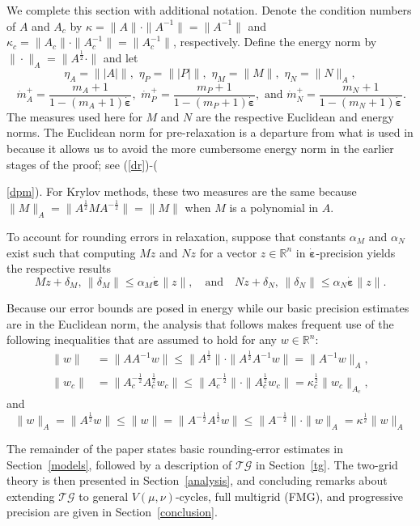 \documentclass[onefignum,onetabnum]{siamart220329}
\newcommand{\ewed}{\boldsymbol{\dot{\varepsilon}}}
\renewcommand{\Re}{\mathbb{R}}
\newcommand{\aladot}{{\dot{m}}_A^+}
\newcommand{\alpdot}{{\dot{m}}_P^+}
\newcommand{\alndot}{{\dot{m}}_N^+}
\newcommand{\tg}{$\mathcal{TG}$}
\begin{document}
We complete this section with additional notation. 
Denote the condition numbers of $A$ and $A_c$ by $\kappa = \|A\| \cdot \|A^{-1}\| =  \|A^{-1}\|$ and $\kappa_c = \|A_c\| \cdot \|A_c^{-1}\| = \|A_c^{-1}\|$, respectively. Define the energy norm by $\|\cdot\|_A = \|A^\frac{1}{2} \cdot\|$ and let
\[
\eta_A= \||A|\|, \,\, \eta_P = \||P|\|, \,\, \eta_M= \|M\|, \,\, \eta_N = \|N\|_A, 
\]
\[
\, \aladot = \frac{m_A + 1}{1 - (m_A + 1){\ewed}} , \,\, \alpdot = \frac{m_P + 1}{1 - (m_P + 1)\ewed} , \textrm{   and   }\alndot = \frac{m_N + 1}{1 - (m_N + 1)\ewed} .
\]
The measures used here for $M$ and $N$ are the respective Euclidean and energy norms. The Euclidean norm for pre-relaxation is a departure from what is used in \cite{McCormick2021} because it allows us to avoid the more cumbersome energy norm in the earlier stages of the proof; see (\ref{dr})-({\ref{dpm}). For Krylov methods, these two measures are the same because $\|M\|_A = \|A^\frac{1}{2}MA^{-\frac{1}{2}}\| = \|M\|$ when $M$ is a polynomial in $A$.

To account for rounding errors in relaxation, suppose that constants $\alpha_M$ and $\alpha_N$ exist such that computing $M z$ and $N z$ for a vector $z \in \Re^n$ in $\ewed$-precision yields the respective results
\begin{equation}
M  z + \delta_M, \, \|\delta_M\| \le \alpha_M \ewed \|z\|, \quad \textrm{and} \quad
N  z + \delta_N, \, \|\delta_N\| \le \alpha_N \ewed \|z\|.
\label{mest}
\end{equation}

Because our error bounds are posed in energy while our basic precision estimates are in the Euclidean norm, the analysis that follows makes frequent use of the following inequalities that are assumed to hold for any $w\in\Re^n$:
\begin{align}
\|w\| &= \|AA^{-1}w\| \le \|A^\frac{1}{2}\| \cdot \|A^\frac{1}{2}A^{-1}w\|= \|A^{-1}w\|_A , 
\label{r}\\
\|w_c\| &= \|A_c^{-\frac{1}{2}}A_c^\frac{1}{2}w_c\| \le \|A_c^{-\frac{1}{2}}\| \cdot \|A_c^\frac{1}{2}w_c\|= \kappa_c^\frac{1}{2} \|w_c\|_{A_c} , 
\label{rc}
\end{align}
and
\begin{equation}
\|w\|_A = \|A^\frac{1}{2}w\| \le \|w\| = \|A^{-\frac{1}{2}} A^\frac{1}{2} w\| \le \|A^{-\frac{1}{2}}\| \cdot \|w\|_A = \kappa^\frac{1}{2} \|w\|_A 
\label{e2E}
\end{equation}

The remainder of the paper states basic rounding-error estimates in Section~\ref{models}, followed by a description of {\tg } in Section~\ref{tg}. The two-grid theory is then presented in Section~\ref{analysis}, and concluding remarks about extending {\tg } to general $V(\mu, \nu)$-cycles, full multigrid (FMG), and progressive precision are given in Section~\ref{conclusion}.

}
\end{document}
